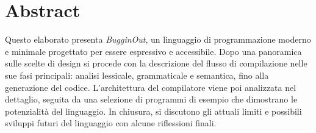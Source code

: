
\chapter*{Abstract}

Questo elaborato presenta \textit{BugginOut}, un linguaggio di programmazione moderno e minimale progettato per essere espressivo e accessibile. Dopo una panoramica sulle scelte di design si procede con la descrizione del flusso di compilazione nelle sue fasi principali: analisi lessicale, grammaticale e semantica, fino alla generazione del codice. L'architettura del compilatore viene poi analizzata nel dettaglio, seguita da una selezione di programmi di esempio che dimostrano le potenzialità del linguaggio. In chiusura, si discutono gli attuali limiti e possibili sviluppi futuri del linguaggio con alcune riflessioni finali.

